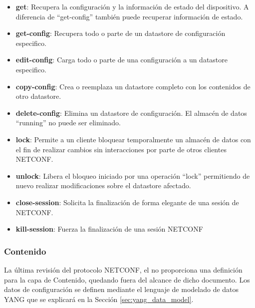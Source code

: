 \begin{itemize}
    \item \textbf{get}: Recupera la configuración y la información de estado del dispositivo. A diferencia de \enquote{get-config} también puede recuperar información de estado.
    \item \textbf{get-config}: Recupera todo o parte de un datastore de configuración especifico. 
    \item \textbf{edit-config}: Carga todo o parte de una configuración a un datastore especifico.
    \item \textbf{copy-config}: Crea o reemplaza un datastore completo con los contenidos de otro datastore.
    \item \textbf{delete-config}: Elimina un datastore de configuración. El almacén de datos \enquote{running} no puede ser eliminado.
    \item \textbf{lock}: Permite a un cliente bloquear temporalmente un almacén de datos con el fin de realizar cambios sin interacciones por parte de otros clientes \gls{NETCONF}.
    \item \textbf{unlock}: Libera el bloqueo iniciado por una operación \enquote{lock} permitiendo de nuevo realizar modificaciones sobre el datastore afectado.
    \item \textbf{close-session}: Solicita la finalización de forma elegante de una sesión de \gls{NETCONF}.
    \item \textbf{kill-session}: Fuerza la finalización de una sesión \gls{NETCONF}
\end{itemize}

\subsubsection{Contenido}

La última revisión del protocolo \gls{NETCONF}, el \cite{RFC6241} no proporciona una definición para la capa de Contenido, quedando fuera del alcance de dicho documento. Los datos de configuración se definen mediante el lenguaje de modelado de datos YANG que se explicará en la Sección \ref{sec:yang_data_model}.




